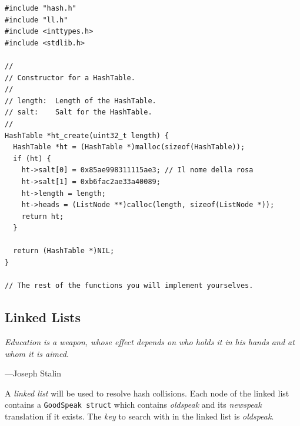 \documentclass{article}
\begin{document}
\lstset{language=C, style=c99}
\begin{lstlisting}[title=hash.c]
#include "hash.h"
#include "ll.h"
#include <inttypes.h>
#include <stdlib.h>

//
// Constructor for a HashTable.
//
// length:  Length of the HashTable.
// salt:    Salt for the HashTable.
//
HashTable *ht_create(uint32_t length) {
  HashTable *ht = (HashTable *)malloc(sizeof(HashTable));
  if (ht) {
    ht->salt[0] = 0x85ae998311115ae3; // Il nome della rosa
    ht->salt[1] = 0xb6fac2ae33a40089;
    ht->length = length;
    ht->heads = (ListNode **)calloc(length, sizeof(ListNode *));
    return ht;
  }

  return (HashTable *)NIL;
}

// The rest of the functions you will implement yourselves.
\end{lstlisting}


\subsection{Linked Lists}
\epigraph{\emph{Education is a weapon, whose effect depends on who holds it in
his hands and at whom it is aimed.}}{---Joseph Stalin}

\noindent
A \emph{linked list} will be used to resolve hash collisions. Each node of
the linked list contains a \texttt{GoodSpeak struct} which contains
\emph{oldspeak} and its \emph{newspeak} translation if it exists. The \emph{key}
to search with in the linked list is \emph{oldspeak}.
\end{document}
